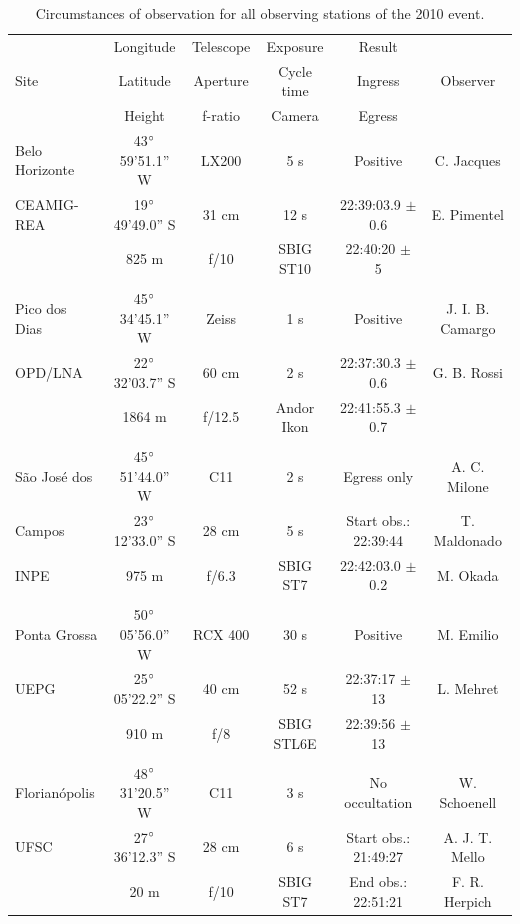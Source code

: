 \documentclass[useAMS,usenatbib]{mn2e}
\begin{document}

\begin{table}
 \centering
 \begin{minipage}{140mm}
  \caption{Circumstances of observation for all observing stations of the 2010 event. \label{Tab: obs-2010}}
  \begin{tabular}{@{}lccccc}
  \hline
          & Longitude & Telescope & Exposure & Result &   \\
     Site & Latitude  & Aperture  & Cycle time & Ingress & Observer\\          
          & Height    & f-ratio & Camera & Egress    & \\          
\hline
 Belo Horizonte & 43$\hbox{$^\circ$}$59'51.1'' W & LX200 & 5 s & Positive & C. Jacques  \\
 CEAMIG-REA &19$\hbox{$^\circ$}$49'49.0'' S & 31 cm & 12 s & 22:39:03.9 $\pm$ 0.6 &  E. Pimentel \\
            & 825 m       &  f/10         &   SBIG ST10        & 22:40:20 $\pm$ 5 &   \\
 & & & & & \\
 Pico dos Dias    & 45$\hbox{$^\circ$}$34'45.1'' W &  Zeiss     & 1 s & Positive & J. I. B. Camargo \\
 OPD/LNA    &22$\hbox{$^\circ$}$32'03.7'' S & 60 cm & 2 s & 22:37:30.3 $\pm$ 0.6 &  G. B. Rossi \\
            & 1864 m     & f/12.5          &    Andor Ikon       & 22:41:55.3 $\pm$ 0.7 &              \\
 & & & & & \\
 S\~ao Jos\'e dos       & 45$\hbox{$^\circ$}$51'44.0'' W &  C11  & 2 s & Egress only & A. C. Milone\\
 Campos       &23$\hbox{$^\circ$}$12'33.0'' S & 28 cm & 5 s & Start obs.: 22:39:44 & T. Maldonado\\
 INPE      & 975 m      & f/6.3          & SBIG ST7     & 22:42:03.0 $\pm$ 0.2 & M. Okada    \\
 & & & & & \\
 Ponta Grossa       & 50$\hbox{$^\circ$}$05'56.0'' W & RCX 400 &30 s & Positive & M. Emilio   \\
 UEPG       &25$\hbox{$^\circ$}$05'22.2'' S & 40 cm & 52 s & 22:37:17 $\pm$ 13 & L. Mehret   \\
            & 910 m      & f/8          & SBIG STL6E     & 22:39:56 $\pm$ 13 & \\
 & & & & & \\
 Florian\'opolis       & 48$\hbox{$^\circ$}$31'20.5'' W &   C11      & 3 s & No occultation  & W. Schoenell\\
 UFSC       &27$\hbox{$^\circ$}$36'12.3'' S & 28 cm & 6 s&  Start obs.: 21:49:27 & A. J. T. Mello\\
            & 20 m       & f/10          &  SBIG ST7      &   End obs.: 22:51:21      & F. R. Herpich \\
\hline
\end{tabular}
\end{minipage}
\end{table}
\end{document}
